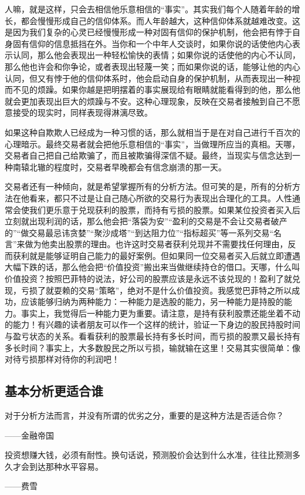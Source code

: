 人嘛，就是这样，只会去相信他乐意相信的“事实”。其实我们每个人随着年龄的增长，都会慢慢形成自己的信仰体系。而人年龄越大，这种信仰体系就越难改变。这是因为我们复杂的心灵已经慢慢形成一种对固有信仰的保护机制，他会把有悖于自身固有信仰的信息抵挡在外。当你和一个中年人交谈时，如果你说的话使他内心表示认同，那么他会表现出一种轻松愉快的表情；如果你说的话使他的内心不认同，那么他也许会和你争论，或者表现出轻蔑一笑；而如果你说的话，能够让他的内心认同，但又有悖于他的信仰体系时，他会启动自身的保护机制，从而表现出一种视而不见的烦躁。如果你越是把明摆着的事实展现给有眼睛就能看得到的他，那么他就会更加表现出巨大的烦躁与不安。这种心理现象，反映在交易者接触到自己不愿意接受的现实时，同样表现得淋漓尽致。

如果这种自欺欺人已经成为一种习惯的话，那么就相当于是在对自己进行千百次的心理暗示。最终交易者就会把他乐意相信的“事实”，当做理所应当的真相。天哪，交易者自己把自己给欺骗了，而且被欺骗得深信不疑。最终，当现实与信念达到一种南辕北辙的程度时，交易者早晚都会有信念崩溃的那一天。

交易者还有一种倾向，就是希望掌握所有的分析方法。但可笑的是，所有的分析方法在他看来，都只不过是让自己随心所欲的交易行为表现出合理化的工具。人性通常会使我们更乐意于兑现获利的股票，而持有亏损的股票。如果某位投资者买入后立刻就出现利润的话，那么他会把“落袋为安”“盈利的交易是不会让交易者破产的”“做交易最忌讳贪婪”“聚沙成塔”“到达阻力位”“指标超买”等一系列交易“名言”来做为他卖出股票的理由。也许这时交易者获利兑现并不需要找任何理由，反而获利就是能够证明自己能力的最好案例。但如果同一位交易者买入后就立即遭遇大幅下跌的话，那么他会把“价值投资”搬出来当做继续持仓的借口。天哪，什么叫价值投资？按照巴菲特的说法，好公司的股票应该是永远不该兑现的！盈利了就兑现，亏损了就耍赖的交易“策略”，绝对不是什么价值投资。我感觉巴菲特之所以成功，应该能够归纳为两种能力：一种能力是选股的能力，另一种能力是持股的能力。事实上，我觉得后一种能力更为重要。请注意，是持有获利股票还能坐着不动的能力！有兴趣的读者朋友可以作一个这样的统计，验证一下身边的股民持股时间与盈亏状态的关系。看看获利的股票最长持有多长时间，而亏损的股票又最长持有多长时间？事实上，大多数股民之所以亏损，输就输在这里！交易其实很简单：像对待亏损那样对待你的利润吧！

\subsection{基本分析更适合谁}

{\kaishu
对于分析方法而言，并没有所谓的优劣之分，重要的是这种方法是否适合你？

\hfill ——金融帝国

投资想赚大钱，必须有耐性。换句话说，预测股价会达到什么水准，往往比预测多久才会到达那种水平容易。

\hfill ——费雪
}

